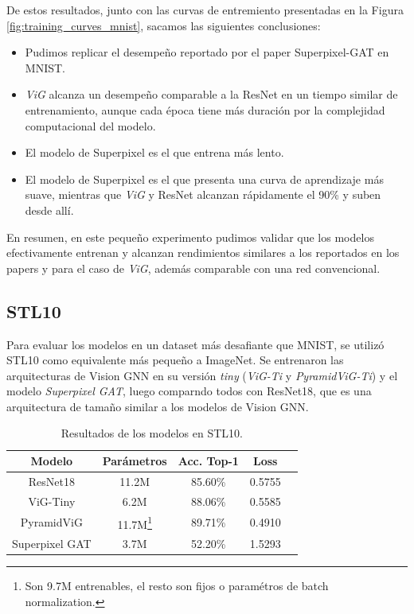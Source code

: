 \documentclass{article}
\begin{document}
De estos resultados, junto con las curvas de entremiento presentadas en la Figura \ref{fig:training_curves_mnist}, sacamos las siguientes conclusiones:
\begin{itemize}
    \item Pudimos replicar el desempeño reportado por el paper Superpixel-GAT en MNIST.
    \item \textit{ViG} alcanza un desempeño comparable a la ResNet en un tiempo similar de entrenamiento, aunque cada época tiene más duración por la complejidad computacional del modelo.
    \item El modelo de Superpixel es el que entrena más lento.
    \item El modelo de Superpixel es el que presenta una curva de aprendizaje más suave, mientras que \textit{ViG} y ResNet alcanzan rápidamente el 90\% y suben desde allí.
\end{itemize}

En resumen, en este pequeño experimento pudimos validar que los modelos efectivamente entrenan y alcanzan rendimientos similares a los reportados en los papers y para el caso de \textit{ViG}, además comparable con una red convencional.

\subsection{STL10}

Para evaluar los modelos en un dataset más desafiante que MNIST, se utilizó STL10 como equivalente más pequeño a ImageNet. Se entrenaron las arquitecturas de Vision GNN en su versión \textit{tiny} (\textit{ViG-Ti} y \textit{PyramidViG-Ti}) y el modelo \textit{Superpixel GAT}, luego comparndo todos con ResNet18, que es una arquitectura de tamaño similar a los modelos de Vision GNN.

\begin{table}[htb]
    \centering
    \begin{tabular}{|c|c|c|c|c|}
        \hline
        \textbf{Modelo} & \textbf{Parámetros}                                                                           & \textbf{Acc. Top-1} & \textbf{Loss} \\
        \hline
        ResNet18        & 11.2M                                                                                         & 85.60\%             & 0.5755        \\
        ViG-Tiny        & 6.2M                                                                                          & 88.06\%             & 0.5585        \\
        PyramidViG      & 11.7M\footnote{Son 9.7M entrenables, el resto son fijos o paramétros de batch normalization.} & 89.71\%             & 0.4910        \\
        Superpixel GAT  & 3.7M                                                                                          & 52.20\%             & 1.5293        \\
        \hline
    \end{tabular}
    \caption{Resultados de los modelos en STL10.}
    \label{tab:stl10_results}
\end{table}
\end{document}
